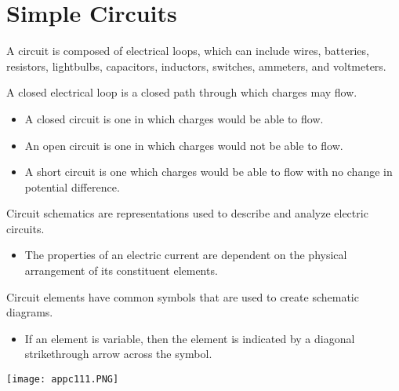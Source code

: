 \documentclass[../em.tex]{subfiles}
\begin{document}
\section{Simple Circuits}
A circuit is composed of electrical loops, which can include wires, batteries, resistors, 
lightbulbs, capacitors, inductors, switches, ammeters, and voltmeters.

A closed electrical loop is a closed path through which charges may flow.
\begin{itemize}
    \item A closed circuit is one in which charges would be able to flow.
    \item An open circuit is one in which charges would not be able to flow.
    \item A short circuit is one which charges would be able to flow with no change in potential difference.
\end{itemize}

Circuit schematics are representations used to describe and analyze electric circuits.
\begin{itemize}
    \item The properties of an electric current are dependent on the physical arrangement of its constituent elements.
\end{itemize}
Circuit elements have common symbols that are used to create schematic diagrams.
\begin{itemize}
    \item If an element is variable, then the element is indicated by a diagonal strikethrough arrow across the symbol.
\end{itemize}
\begin{center}
    \texttt{[image: appc111.PNG]}
\end{center}
\end{document}
